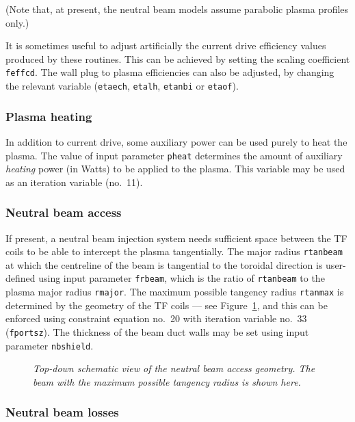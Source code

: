 \documentclass[11pt,a4paper]{report}
\begin{document}
(Note that, at present, the neutral beam models assume parabolic plasma
profiles only.)

It is sometimes useful to adjust artificially the current drive efficiency
values produced by these routines. This can be achieved by setting the scaling
coefficient \texttt{feffcd}. The wall plug to plasma efficiencies can also be
adjusted, by changing the relevant variable (\texttt{etaech}, \texttt{etalh},
\texttt{etanbi} or \texttt{etaof}).

\subsubsection{Plasma heating}

In addition to current drive, some auxiliary power can be used purely to heat
the plasma. The value of input parameter \texttt{pheat} determines the amount
of auxiliary \textit{heating}\/ power (in Watts) to be applied to the
plasma. This variable may be used as an iteration variable (no.\ 11).

\subsubsection{Neutral beam access}

If present, a neutral beam injection system needs sufficient space between the
TF coils to be able to intercept the plasma tangentially. The major radius
\texttt{rtanbeam} at which the centreline of the beam is tangential to the
toroidal direction is user-defined using input parameter \texttt{frbeam},
which is the ratio of \texttt{rtanbeam} to the plasma major radius
\texttt{rmajor}. The maximum possible tangency radius \texttt{rtanmax} is
determined by the geometry of the TF coils --- see Figure~\ref{fig:portsize},
and this can be enforced using constraint equation no.\ 20 with iteration
variable no.\ 33 (\texttt{fportsz}). The thickness of the beam duct walls may
be set using input parameter \texttt{nbshield}.

\begin{figure}[tbph]
\caption[Schematic diagram of the neutral beam access geometry]
{\label{fig:portsize}
  \textit{Top-down schematic view of the neutral beam access geometry. The beam
    with the maximum possible tangency radius is shown here.}
}
\end{figure}

\subsubsection{Neutral beam losses}
\end{document}
